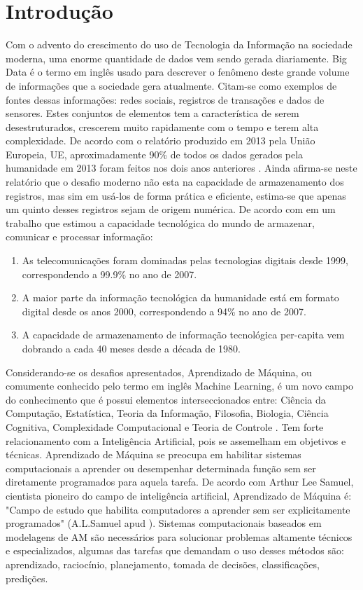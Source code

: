 \chapter{Introdução}


Com o advento do crescimento do uso de Tecnologia da Informação na sociedade moderna, uma enorme quantidade de dados vem sendo gerada diariamente. Big Data é o termo em inglês usado para descrever o fenômeno deste grande volume de informações que a sociedade gera atualmente. Citam-se como exemplos de fontes dessas informações: redes sociais, registros de transações e dados de sensores. Estes conjuntos de elementos tem a característica de serem desestruturados, crescerem muito rapidamente com o tempo e terem alta complexidade. De acordo com o relatório produzido em 2013 pela União Europeia, UE, aproximadamente 90\% de todos os dados gerados pela humanidade em 2013 foram feitos nos dois anos anteriores \cite{eu2013}. Ainda afirma-se neste relatório que o desafio moderno não esta na capacidade de armazenamento dos registros, mas sim em usá-los de forma prática e eficiente, estima-se que apenas um quinto desses registros sejam de origem numérica. De acordo com \cite{lopez2011} em um trabalho que estimou a capacidade tecnológica do mundo de armazenar, comunicar e processar informação: 
\begin{enumerate}
\item As telecomunicações foram dominadas pelas tecnologias digitais desde 1999, correspondendo a 99.9\% no ano de 2007. 
\item A maior parte da informação tecnológica da humanidade está em formato digital desde os anos 2000, correspondendo a 94\% no ano de 2007.
\item A capacidade de armazenamento de informação tecnológica per-capita vem dobrando a cada 40 meses desde a década de 1980.
\end{enumerate}
   

Considerando-se os desafios apresentados, Aprendizado de Máquina, ou comumente conhecido pelo termo em inglês Machine Learning, é um novo campo do conhecimento que é possui elementos  interseccionados entre: Ciência da Computação, Estatística, Teoria da Informação, Filosofia, Biologia, Ciência Cognitiva, Complexidade Computacional e Teoria de Controle \cite{mitch1997}. Tem forte relacionamento  com a Inteligência Artificial, pois se assemelham em objetivos e técnicas. Aprendizado de Máquina se preocupa em habilitar sistemas computacionais a aprender ou desempenhar determinada função sem ser diretamente programados para aquela tarefa. De acordo com Arthur Lee Samuel, cientista pioneiro do campo de inteligência artificial, Aprendizado de Máquina é: "Campo de estudo que habilita computadores a aprender sem ser explicitamente programados" (A.L.Samuel apud ). Sistemas computacionais baseados em modelagens de AM são necessários para solucionar problemas altamente técnicos e especializados, algumas das tarefas que demandam o uso desses métodos são: aprendizado, raciocínio, planejamento, tomada de decisões, classificações, predições. 

